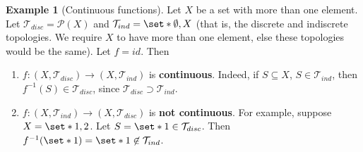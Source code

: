 \documentclass[11pt]{article}
\numberwithin{equation}{section}
\theoremstyle{plain}
\theoremstyle{definition}
\newtheorem{example}{\color{WildStrawberry}Example}[section]
\newcommand\inv[1]{#1^{-1}}
\def\Set{\set*}%
\def\sse{\subseteq}
\newcommand{\1}{\mathbbm 1}
\newcommand{\pP}{\mathcal P}
\newcommand{\tT}{\mathcal T}
\begin{document}
\begin{example}[Continuous functions]
	Let $X$ be a set with more than one element. Let $\tT_{disc} = \pP(X)$ and $\tT_{ind} = \Set{\emptyset, X}$ (that is, the discrete and indiscrete topologies. We require $X$ to have more than one element, else these topologies would be the same). Let $f = id$. Then
	\begin{enumerate}
		\item $f: (X,\tT_{disc}) \to (X,\tT_{ind})$ is \textbf{continuous}. Indeed, if $S \sse X$, $S\in \tT_{ind}$, then $f^{-1}(S) \in \tT_{disc}$, since $\tT_{disc} \supset \tT_{ind}$. 

		\item $f: (X,\tT_{ind}) \to (X,\tT_{disc})$ is \textbf{not continuous}. For example, suppose $X = \Set{1,2}$. Let $S = \Set{1} \in \tT_{disc}$. Then $\inv{f}(\Set{1}) = \Set{1} \not \in \tT_{ind}$. 
	\end{enumerate}
\end{example}
\end{document}
